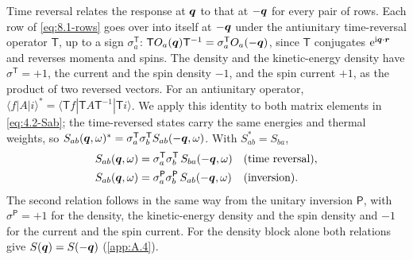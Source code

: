 Time reversal relates the response at $\bm{q}$ to that at $-\bm{q}$ for every pair of rows. Each row of \cref{eq:8.1-rows} goes over into itself at $-\bm{q}$ under the antiunitary time-reversal operator $\mathsf{T}$, up to a sign $\sigma^{\mathsf{T}}_a$: $\mathsf{T}O_a(\bm{q})\mathsf{T}^{-1} = \sigma^{\mathsf{T}}_aO_a(-\bm{q})$, since $\mathsf{T}$ conjugates $\mathrm{e}^{\mathrm{i}\bm{q}\cdot\bm{r}}$ and reverses momenta and spins. The density and the kinetic-energy density have $\sigma^{\mathsf{T}} = +1$, the current and the spin density $-1$, and the spin current $+1$, as the product of two reversed vectors. For an antiunitary operator, $\langle f|A|i\rangle^* = \langle\mathsf{T}f|\mathsf{T}A\mathsf{T}^{-1}|\mathsf{T}i\rangle$. We apply this identity to both matrix elements in \cref{eq:4.2-Sab}; the time-reversed states carry the same energies and thermal weights, so $S_{ab}(\bm{q},\omega)^* = \sigma^{\mathsf{T}}_a\sigma^{\mathsf{T}}_bS_{ab}(-\bm{q},\omega)$. With $S_{ab}^* = S_{ba}$,
\begin{equation}
  \begin{aligned}
  S_{ab}(\bm{q},\omega) &= \sigma^{\mathsf{T}}_a\sigma^{\mathsf{T}}_b\,S_{ba}(-\bm{q},\omega) &&(\text{time reversal}), \\
  S_{ab}(\bm{q},\omega) &= \sigma^{\mathsf{P}}_a\sigma^{\mathsf{P}}_b\,S_{ab}(-\bm{q},\omega) &&(\text{inversion}) .
  \end{aligned}
  \label{eq:14.5-recip}
\end{equation}
The second relation follows in the same way from the unitary inversion $\mathsf{P}$, with $\sigma^{\mathsf{P}} = +1$ for the density, the kinetic-energy density and the spin density and $-1$ for the current and the spin current. For the density block alone both relations give $S(\bm{q}) = S(-\bm{q})$ (\cref{app:A.4}).

